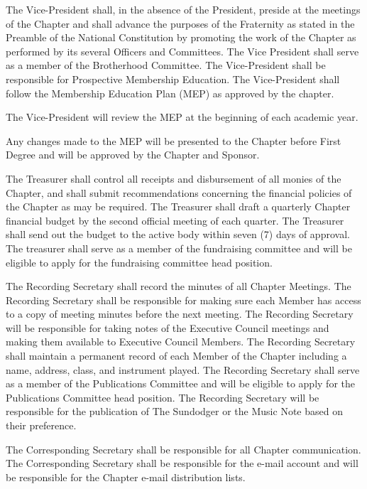 \documentclass[11pt]{article}
\begin{document}
\begin{legal}
    The Vice-President shall, in the absence of the President, preside at the meetings of the Chapter and shall advance the purposes of the Fraternity as stated in the Preamble of the National Constitution by promoting the work of the Chapter as performed by its several Officers and Committees.
    The Vice President shall serve as a member of the Brotherhood Committee.
    The Vice-President shall be responsible for Prospective Membership Education.
    The Vice-President shall follow the Membership Education Plan (MEP) as approved by the chapter.
    \begin{legal}
      \item
        The Vice-President will review the MEP at the beginning of each academic year.
      \item
        Any changes made to the MEP will be presented to the Chapter before First Degree and will be approved by the Chapter and Sponsor.
    \end{legal}
  \item
    The Treasurer shall control all receipts and disbursement of all monies of the Chapter, and shall submit recommendations concerning the financial policies of the Chapter as may be required.
    The Treasurer shall draft a quarterly Chapter financial budget by the second official meeting of each quarter. The Treasurer shall send out the budget to the active body within seven (7) days of approval.
    The treasurer shall serve as a member of the fundraising committee and will be eligible to apply for the fundraising committee head position. 
  \item
    The Recording Secretary shall record the minutes of all Chapter Meetings.
    The Recording Secretary shall be responsible for making sure each Member has access to a copy of meeting minutes before the next meeting.
    The Recording Secretary will be responsible for taking notes of the Executive Council meetings and making them available to Executive Council Members.
    The Recording Secretary shall maintain a permanent record of each Member of the Chapter including a name, address, class, and instrument played.
    The Recording Secretary shall serve as a member of the Publications Committee and will be eligible to apply for the Publications Committee head position.
    The Recording Secretary will be responsible for the publication of The Sundodger or the Music Note based on their preference.
  \item
    The Corresponding Secretary shall be responsible for all Chapter communication.
    The Corresponding Secretary shall be responsible for the e-mail account and will be responsible for the Chapter e-mail distribution lists.

\end{legal}
\end{document}
